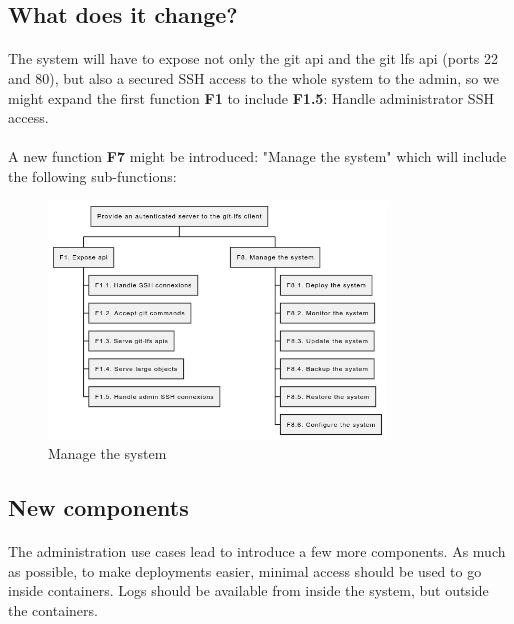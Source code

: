 \newpage
\subsection{What does it change?}

\paragraph{}
The system will have to expose not only the git api and the git lfs api (ports 22 and 80), but also a secured SSH access to the whole system to the admin, so we might expand the first function \textbf{F1} to include \textbf{F1.5}: Handle administrator SSH access. 

\paragraph{}
A new function \textbf{F7} might be introduced: "Manage the system" which will include the following sub-functions:

\begin{figure}[h]
    \centering
    \includegraphics[width=0.8\textwidth]{iteration_02/diagrams/functions_v2.png}
    \caption{Manage the system}
    \label{fig:functions_v2}
\end{figure}

\newpage
\subsection{New components}

\paragraph{}
The administration use cases lead to introduce a few more components. As much as possible, to make deployments easier, minimal access should be used to go inside containers. Logs should be available from inside the system, but outside the containers. 

